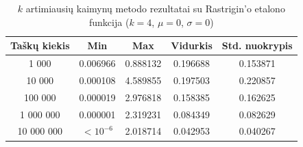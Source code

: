 \begin{table}[H]
    \centering
    \begin{tabular}{|c|c|c|c|c|}
        \hline
        \textbf{Taškų kiekis} & \textbf{Min} & \textbf{Max} & \textbf{Vidurkis} & \textbf{Std. nuokrypis} \\ \hline
        1 000        & 0.006966 & 0.888132 & 0.196688 & 0.153871 \\ \hline
        10 000       & 0.000108 & 4.589855 & 0.197503 & 0.220857 \\ \hline
        100 000      & 0.000019 & 2.976818 & 0.158385 & 0.162625 \\ \hline
        1 000 000    & 0.000001 & 2.319231 & 0.084349 & 0.082629 \\ \hline
        10 000 000   & $<10^{-6}$ & 2.018714 & 0.042953 & 0.040267 \\ \hline
    \end{tabular}
    \caption{$k$ artimiausių kaimynų metodo rezultatai su Rastrigin'o etalono funkcija ($k = 4$, $\mu = 0$, $\sigma = 0$)}
\end{table}